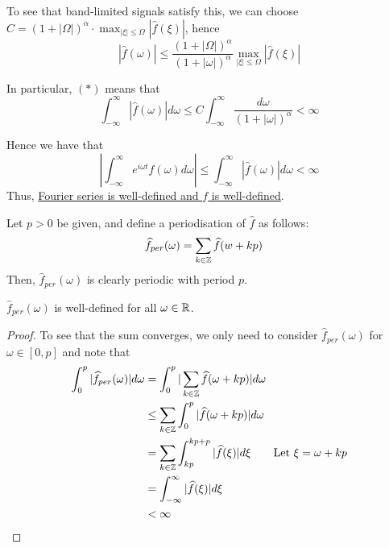 \documentclass{article}
\begin{document}
To see that band-limited signals satisfy this, we can choose $C = (1 + |\Omega|)^{\alpha} \cdot \max_{|\xi| \leq \Omega} |\widehat{f}(\xi)|$, hence
\[|\widehat{f}(\omega)| \leq \frac{(1 + |\Omega|)^{\alpha}}{(1 + |\omega|)^{\alpha}} \max_{|\xi| \leq \Omega} |\widehat{f}(\xi)|\]

In particular, $(*)$ means that
\[\int_{-\infty}^\infty |\widehat{f}(\omega)| d\omega \leq C \int_{-\infty}^\infty \frac{d\omega}{(1 + |\omega|)^\alpha} < \infty\]

Hence we have that
\[|\int_{-\infty}^\infty e^{i\omega t} \widehat{f}(\omega) d\omega| \leq \int_{-\infty}^\infty |\widehat{f}(\omega)| d\omega < \infty\]
Thus, \underline{Fourier series is well-defined and $f$ is well-defined}.\\

\begin{definition}
Let $p > 0$ be given, and define a periodisation of $\widehat{f}$ as follows:
\begin{align*}
    \widehat{f}_{per}(\omega) &= \sum_{k \in \mathbb{Z}} \widehat{f}(w + kp)
\end{align*}
Then, $\widehat{f}_{per}(\omega)$ is clearly periodic with period $p$. 
\end{definition}

\begin{proposition}
    $\widehat{f}_{per}(\omega)$ is well-defined for all $\omega \in \mathbb{R}$.
\end{proposition}

\begin{proof}
    To see that the sum converges, we only need to consider $\widehat{f}_{per}(\omega)$ for $\omega \in [0, p]$ and note that
\begin{align*}
    \int_0^p |\widehat{f}_{per}(\omega)| d\omega &= \int_0^p |\sum_{k \in \mathbb{Z}} \widehat{f}(\omega + kp)| d\omega\\
    &\leq \sum_{k \in \mathbb{Z}} \int_0^p |\widehat{f}(\omega + kp)| d\omega\\
    &= \sum_{k \in \mathbb{Z}} \int_{kp}^{kp +p} |\widehat{f}(\xi)| d\xi \tag*{Let $\xi = \omega + kp$}\\
    &= \int_{-\infty}^\infty |\widehat{f}(\xi)| d\xi\\
    &< \infty
\end{align*}
\end{proof}
\end{document}
